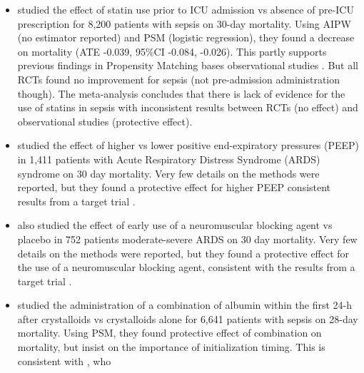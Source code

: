 \documentclass[10pt,letterpaper]{article}
\begin{document}
\begin{itemize}[leftmargin=2ex]
    \item \cite{chinaeke2021impact} studied the effect of \textcolor{I}{statin use
              prior to ICU admission} vs \textcolor{C}{absence of pre-ICU
              prescription} for \textcolor{P}{8,200 patients with sepsis} on
          \textcolor{O}{30-day mortality}. Using AIPW (no estimator reported)
          and PSM (logistic regression), they found a decrease on mortality (ATE
          -0.039, 95\%CI -0.084, -0.026). This partly supports previous
          findings in Propensity Matching bases observational studies
          \cite{lee2017preadmission,kyu2019preadmission}. But all RCTs
          \cite{national2014rosuvastatin,singh2017effects} found no improvement for sepsis (not
          pre-admission administration though). The \cite{wan2014effect}
          meta-analysis concludes that there is lack of evidence for the use of
          statins in sepsis with inconsistent results between RCTs (no effect)
          and observational studies (protective effect).
    \item \cite{adibuzzaman2019323} studied the effect of \textcolor{I}{higher} vs
          \textcolor{C}{lower positive end-expiratory pressures (PEEP)} in
          \textcolor{P}{1,411 patients with Acute Respiratory Distress Syndrome
              (ARDS) syndrome} on \textcolor{O}{30 day mortality}. Very few details on
          the methods were reported, but they found a protective effect for higher PEEP
          consistent results from a target trial \cite{national2004higher}.
    \item \cite{adibuzzaman2019323} also studied the effect of \textcolor{I}{early
              use of a neuromuscular blocking agent } vs \textcolor{C}{placebo} in
          \textcolor{P}{752 patients moderate-severe ARDS} on \textcolor{O}{30
              day mortality}. Very few details on the methods were reported, but they found a
          protective effect for the use of a neuromuscular blocking agent,
          consistent with the results from a target trial
          \cite{papazian2010neuromuscular}.
    \item \cite{zhou2021early} studied the administration of \textcolor{I}{a
              combination of albumin within the first 24-h after crystalloids} vs
          \textcolor{C}{crystalloids alone} for \textcolor{P}{6,641 patients
              with sepsis} on \textcolor{O}{28-day mortality}. Using PSM, they found
          protective effect of combination on mortality, but insist on the
          importance of initialization timing. This is consistent with \cite{xu2014comparison}, who

\end{itemize}
\end{document}
